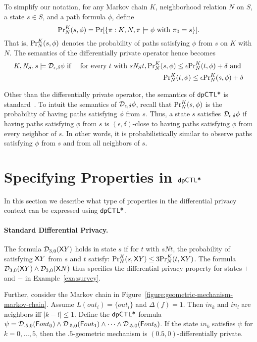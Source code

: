 To simplify our notation, for any Markov chain $K$, neighborhood
relation $N$ on $S$, a state $s \in S$, and a path formula $\phi$,
define
\[
\myPr{s}{K}{N}{\phi} =
\Pr [ \{ \pi : K, N, \pi \models \phi \textmd{ with } \pi_0 = s \} ].
\]
That is, $\myPr{s}{K}{N}{\phi}$ denotes the probability of paths
satisfying $\phi$ from $s$ on $K$ with $N$. The semantics of the
differentially private operator hence becomes
\begin{eqnarray*}
  K, \neighbor{S}, s \models \dpriv{\epsilon}{\delta} \phi
  & \textmd{ if } &
  \textmd{for every } t \textmd{ with }  s \neighbor{S} t,
      \myPr{s}{K}{N}{\phi} \leq \epsilon \myPr{t}{K}{N}{\phi} + \delta
      \textmd{ and }\\
  & &  \myPr{t}{K}{N}{\phi} \leq \epsilon \myPr{s}{K}{N}{\phi} + \delta
\end{eqnarray*}

Other than the differentially private operator, the semantics of
$\dpCTL$ is standard~\cite{BK:08:PMC}.
To intuit the semantics of $\dpriv{\epsilon}{\delta} \phi$,
recall that  $\myPr{s}{K}{N}{\phi}$ is the probability of having
paths satisfying $\phi$ from $s$. Thus, a state $s$ satisfies
$\dpriv{\epsilon}{\delta} \phi$ if having paths satisfying $\phi$
from $s$ is $(\epsilon, \delta)$-close to having paths satisfying
$\phi$ from every neighbor of $s$. In other words, it is
probabilistically similar to observe paths satisfying $\phi$ from $s$
and from all neighbors of $s$.

\section{Specifying Properties in $\dpCTL$}
In this section we describe what type of properties in the differential privacy context can be expressed using $\dpCTL$.

\paragraph{Standard Differential Privacy.} 
The formula $\dpriv{3}{0} (\X Y)$ holds in state $s$ if for  $t$ with $sNt$, the probability of satisfying $\X Y$ from $s$ and $t$ satisfy:
$\myPr{s}{K}{N}{\X Y}\le 3\myPr{t}{K}{N}{\X Y}$. The formula $\dpriv{3}{0} (\X Y)\wedge \dpriv{3}{0} (\X N)$ thus specifies the differential privacy property for states $+$ and $-$ in Example~\ref{exa:survey}.

Further, consider the Markov chain in
Figure~\ref{figure:geometric-mechanism-markov-chain}. Assume
$L(out_i) = \{ out_i \}$ and $\Delta (f) = 1$. Then $in_k$ and $in_l$ are
neighbors iff $| k - l | \leq 1$. Define the $\dpCTL$ formula
$\psi = \dpriv{.5}{0} (\F out_0) \wedge \dpriv{.5}{0} (\F out_1) \wedge
\cdots \wedge \dpriv{.5}{0} (\F out_5)$. If the state $in_k$ satisfies
$\psi$ for $k = 0, \ldots, 5$, then the $.5$-geometric mechanism is
$(0.5, 0)$-differentially private.


